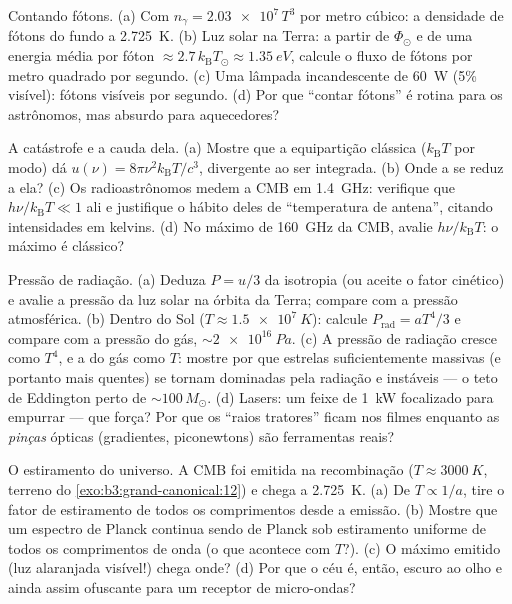 \begin{exercise}[$\star$]\label{exo:b3:photons-phonons:3}
Contando fótons. (a) Com $n_\gamma = \num{2.03e7}\,T^3$ por
metro cúbico: a densidade de fótons do fundo a \qty{2.725}{K}.
(b) Luz solar na Terra: a partir de $\Phi_\odot$ e de uma energia média
por fóton $\approx 2.7\,k_{\text{B}}T_\odot \approx \qty{1.35}{eV}$,
calcule o fluxo de fótons por metro quadrado por segundo. (c) Uma
lâmpada incandescente de \qty{60}{W} (5\% visível): fótons visíveis por
segundo. (d) Por que ``contar fótons'' é rotina para os astrônomos,
mas absurdo para aquecedores?
\end{exercise}

\begin{exercise}[$\star$]\label{exo:b3:photons-phonons:4}
A catástrofe e a cauda dela. (a) Mostre que a equipartição clássica
($k_{\text{B}}T$ por modo) dá $u(\nu) =
8\pi\nu^2k_{\text{B}}T/c^3$, divergente ao ser integrada. (b) Onde
a  se reduz a ela? (c) Os radioastrônomos medem a
CMB em \qty{1.4}{GHz}: verifique que $h\nu/k_{\text{B}}T \ll 1$ ali e
justifique o hábito deles de ``temperatura de antena'', citando
intensidades em kelvins. (d) No máximo de \qty{160}{GHz} da CMB, avalie
$h\nu/k_{\text{B}}T$: o máximo é clássico?
\end{exercise}

\begin{exercise}[$\star\star$]\label{exo:b3:photons-phonons:5}
Pressão de radiação. (a) Deduza $P = u/3$ da isotropia (ou aceite
o fator cinético) e avalie a pressão da luz solar na
órbita da Terra; compare com a pressão atmosférica. (b) Dentro do
Sol ($T \approx \qty{1.5e7}{K}$): calcule $P_{\text{rad}} =
aT^4/3$ e compare com a pressão do gás, $\sim\qty{2e16}{Pa}$.
(c) A pressão de radiação cresce como $T^4$, e a do gás como $T$: mostre
por que estrelas suficientemente massivas (e portanto mais quentes) se
tornam dominadas pela radiação e instáveis --- o teto de Eddington perto
de $\sim100\,M_\odot$. (d) Lasers: um feixe de \qty{1}{kW} focalizado
para empurrar --- que força? Por que os ``raios tratores'' ficam nos
filmes enquanto as \emph{pinças} ópticas (gradientes, piconewtons) são
ferramentas reais?
\end{exercise}

\begin{exercise}[$\star\star$]\label{exo:b3:photons-phonons:6}
O estiramento do universo. A CMB foi emitida na recombinação
($T \approx \qty{3000}{K}$, terreno do
\cref{exo:b3:grand-canonical:12}) e chega a \qty{2.725}{K}. (a) De $T \propto
1/a$, tire o fator de estiramento de todos os comprimentos
desde a emissão. (b) Mostre que um espectro de Planck continua sendo de
Planck sob estiramento uniforme de todos os comprimentos de onda (o que
acontece com $T$?). (c) O máximo emitido (luz alaranjada visível!)
chega onde? (d) Por que o céu é, então, escuro ao olho e ainda assim
ofuscante para um receptor de micro-ondas?
\end{exercise}

